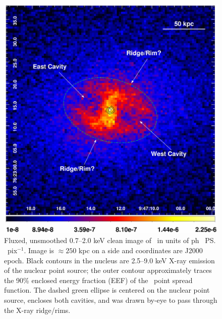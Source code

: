 \begin{figure}
  \begin{center}
    \begin{minipage}{\linewidth}
      \includegraphics*[width=\textwidth, trim=0mm 0mm 0mm 0mm, clip]{arx_rbs797.ps}
    \end{minipage}
    \caption{Fluxed, unsmoothed 0.7--2.0 keV clean image of \rbs\ in
      units of ph \pcmsq\ \ps\ pix$^{-1}$. Image is $\approx 250$ kpc
      on a side and coordinates are J2000 epoch. Black contours in the
      nucleus are 2.5--9.0 keV X-ray emission of the nuclear point
      source; the outer contour approximately traces the 90\% enclosed
      energy fraction (EEF) of the \cxo\ point spread function. The
      dashed green ellipse is centered on the nuclear point source,
      encloses both cavities, and was drawn by-eye to pass through the
      X-ray ridge/rims.}
    \label{fig:img}
  \end{center}
\end{figure}

